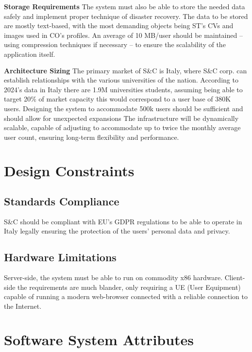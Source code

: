 \par{\textbf{Storage Requirements}} The system must also be able to store the needed data safely and implement proper
technique of disaster recovery. The data to be stored are mostly text-based, with the most demanding objects being ST’s
CVs and images used in CO’s profiles. An average of 10 MB/user should be maintained – using compression techniques if
necessary – to ensure the scalability of the application itself.

\par{\textbf{Architecture Sizing}} The primary market of S\&C is Italy, where S\&C corp. can establish relationships
with the various universities of the nation. According to 2024’s data in Italy there are 1.9M universities students,
assuming being able to target 20\% of market capacity this would correspond to a user base of 380K users. Designing the
system to accommodate 500k users should be sufficient and should allow for unexpected expansions The infrastructure
will be dynamically scalable, capable of adjusting to accommodate up to twice the monthly average user count, ensuring
long-term flexibility and performance.

\section{Design Constraints}
\label{sec:design-constraints}%

\subsection{Standards Compliance}
\label{subsec:standards-compliance}%

\par S\&C should be compliant with EU’s GDPR regulations to be able to operate in Italy legally ensuring the protection
of the users’ personal data and privacy.

\subsection{Hardware Limitations}
\label{subsec:hardware-limitations}%

\par Server-side, the system must be able to run on commodity x86 hardware. Client-side the requirements are much
blander, only requiring a UE (User Equipment) capable of running a modern web-browser connected with a reliable
connection to the Internet.

\section{Software System Attributes}
\label{sec:software-system-attributes}%

